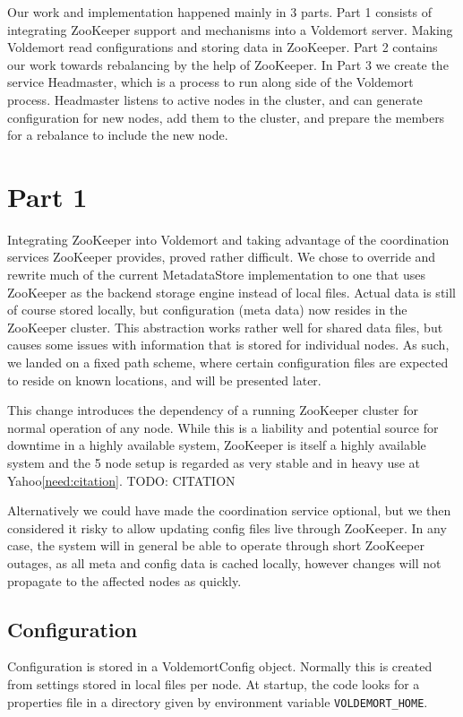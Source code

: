 
Our work and implementation happened mainly in 3 parts. Part 1 consists of integrating ZooKeeper support and mechanisms into a Voldemort server. Making Voldemort read configurations and storing data in ZooKeeper. Part 2 contains our work towards rebalancing by the help of ZooKeeper. In Part 3 we create the service Headmaster, which is a process to run along side of the Voldemort process. Headmaster listens to active nodes in the cluster, and can generate configuration for new nodes, add them to the cluster, and prepare the members for a rebalance to include the new node.

\section{Part 1}
Integrating ZooKeeper into Voldemort and taking advantage of the coordination services ZooKeeper provides, proved rather difficult.
We chose to override and rewrite much of the current MetadataStore implementation to one that uses ZooKeeper as the backend storage engine instead of local files. 
Actual data is still of course stored locally, but configuration (meta data) now resides in the ZooKeeper cluster.
This abstraction works rather well for shared data files, but causes some issues with information that is stored for individual nodes. 
As such, we landed on a fixed path scheme, where certain configuration files are expected to reside on known locations, and will be presented later.

This change introduces the dependency of a running ZooKeeper cluster for normal operation of any node. While this is a liability and potential source for downtime in a highly available system, ZooKeeper is itself a highly available system and the 5 node setup is regarded as very stable and in heavy use at Yahoo\ref{need:citation}.
TODO: CITATION

Alternatively we could have made the coordination service optional, but we then considered it risky to allow updating config files live through ZooKeeper. In any case, the system will in general be able to operate through short ZooKeeper outages, as all meta and config data is cached locally, however changes will not propagate to the affected nodes as quickly.

\subsection{Configuration}
Configuration is stored in a VoldemortConfig object. Normally this is created from settings stored in local files per node. At startup, the code looks for a properties file in a directory given by environment variable \texttt{VOLDEMORT\_HOME}. 

